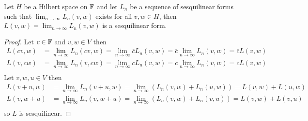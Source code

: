 \begin{prop}\label{hilbert:PointwiseLimitOfSesquilinearForm}Let $H$ be a Hilbert space on $\mathbb{F}$ and let $L_n$ be a sequence of
  sesquilinear forms such that $\lim_{n\to \infty}L_n (v,w)$ exists for all $v,w \in H$, then $L(v , w) = \lim_{n \to \infty} L_n(v,w)$ is a sesquilinear form.
\end{prop}
\begin{proof}
Let $c \in \mathbb{F}$ and $v,w \in V$ then
\begin{align*}
  L(cv, w) &= \lim_{n \to \infty} L_n(cv, w)
             = \lim_{n \to \infty} \overline{c} L_n(v, w)
             = \overline{c} \lim_{n \to \infty} L_n(v, w)
             = \overline{c} L(v, w) \\
  L(v, cw) &= \lim_{n \to \infty} L_n(v, cw)
             = \lim_{n \to \infty} c L_n(v, w)
             = c \lim_{n \to \infty} L_n(v, w)
             = c L(v, w) \\             
\end{align*}
Let $v,w,u \in V$ then
\begin{align*}
  L(v + u, w) &= \lim_{n \to \infty} L_n(v + u, w)
                =\lim_{n \to \infty} \left( L_n(v, w) +  L_n(u,
                w)\right)
                = L(v,w) + L(u, w) \\
  L(v, w + u) &= \lim_{n \to \infty} L_n(v, w + u)
                =\lim_{n \to \infty} \left( L_n(v, w) +  L_n(v, u)\right)
                = L(v,w) + L(v, u) \\
\end{align*}
  so $L$ is sesquilinear.
\end{proof}


